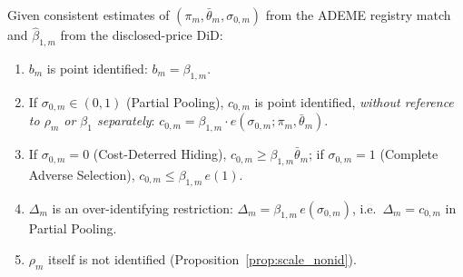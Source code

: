 \label{prop:what_identified}
Given consistent estimates of $(\pi_m,\bar\theta_m,\sigma_{0,m})$ from the ADEME registry match
and $\hat\beta_{1,m}$ from the disclosed-price DiD:
\begin{enumerate}[label=(\roman*)]
    \item $b_m$ is point identified: $b_m=\beta_{1,m}$.
    \item If $\sigma_{0,m}\in(0,1)$ (Partial Pooling), $c_{0,m}$ is point identified,
        \emph{without reference to $\rho_m$ or $\beta_1$ separately}:
        $c_{0,m}=\beta_{1,m}\cdot e(\sigma_{0,m};\pi_m,\bar\theta_m)$.
    \item If $\sigma_{0,m}=0$ (Cost-Deterred Hiding), $c_{0,m}\ge\beta_{1,m}\bar\theta_m$; if
        $\sigma_{0,m}=1$ (Complete Adverse Selection), $c_{0,m}\le\beta_{1,m}\,e(1)$.
    \item $\Delta_m$ is an over-identifying restriction: $\Delta_m=\beta_{1,m}\,e(\sigma_{0,m})$,
        i.e.\ $\Delta_m=c_{0,m}$ in Partial Pooling.
    \item $\rho_m$ itself is not identified (Proposition~\ref{prop:scale_nonid}).
\end{enumerate}
